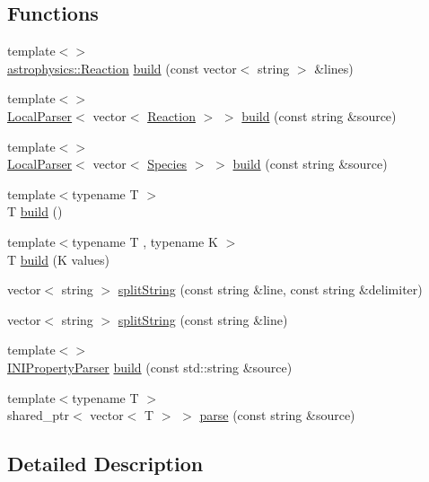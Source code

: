 \subsection*{Functions}
\begin{DoxyCompactItemize}
\item 
{\footnotesize template$<$$>$ }\\\hyperlink{a00022}{astrophysics\+::\+Reaction} \hyperlink{a00085_abca66b4f2a1543308b663714bd8b4855}{build} (const vector$<$ string $>$ \&lines)
\item 
{\footnotesize template$<$$>$ }\\\hyperlink{a00019}{Local\+Parser}$<$ vector$<$ \hyperlink{a00022}{Reaction} $>$ $>$ \hyperlink{a00085_aaf82cc265522a41ebc36e8405e0c7559}{build} (const string \&source)
\item 
{\footnotesize template$<$$>$ }\\\hyperlink{a00019}{Local\+Parser}$<$ vector$<$ \hyperlink{a00028}{Species} $>$ $>$ \hyperlink{a00085_a138f22945f7a7ec642432fd24a94b414}{build} (const string \&source)
\item 
{\footnotesize template$<$typename T $>$ }\\T \hyperlink{a00085_a5c0e80ce60cddb0a4ac83333b41fded1}{build} ()
\item 
{\footnotesize template$<$typename T , typename K $>$ }\\T \hyperlink{a00085_a45fa78347513e865dc6c767cff0b4ef1}{build} (K values)
\item 
vector$<$ string $>$ \hyperlink{a00085_af9246260a2324ca34737fc15210e5231}{split\+String} (const string \&line, const string \&delimiter)
\item 
vector$<$ string $>$ \hyperlink{a00085_a93688d46b0b3eb4b91a913d0151696c0}{split\+String} (const string \&line)
\item 
{\footnotesize template$<$$>$ }\\\hyperlink{a00013}{I\+N\+I\+Property\+Parser} \hyperlink{a00085_a624f274bd6de1d7b829c9883ac3397cd}{build} (const std\+::string \&source)
\item 
{\footnotesize template$<$typename T $>$ }\\shared\+\_\+ptr$<$ vector$<$ T $>$ $>$ \hyperlink{a00085_a2b47cfd8a5d8711cdc55e1397487b90b}{parse} (const string \&source)
\end{DoxyCompactItemize}


\subsection{Detailed Description}


